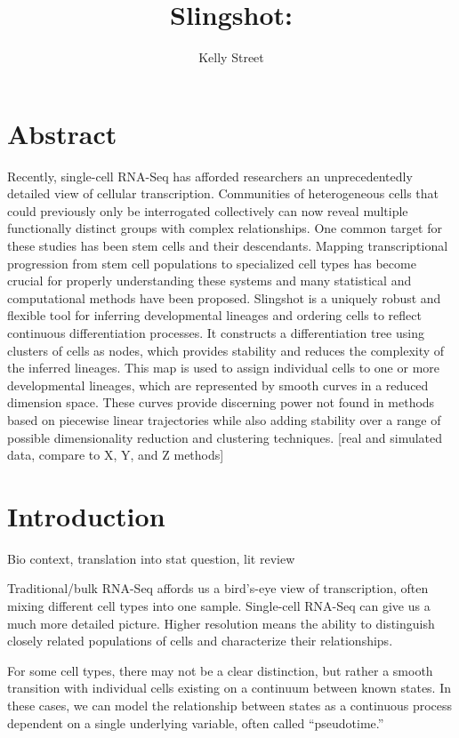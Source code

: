 \documentclass[11pt]{article}\usepackage[]{graphicx}\usepackage[]{color}
\title{Slingshot: }
\author{Kelly Street}
\date{}
\begin{document}
\maketitle

\section{Abstract}
Recently, single-cell RNA-Seq has afforded researchers an unprecedentedly detailed view of cellular transcription. Communities of heterogeneous cells that could previously only be interrogated collectively can now reveal multiple functionally distinct groups with complex relationships. One common target for these studies has been stem cells and their descendants. Mapping transcriptional progression from stem cell populations to specialized cell types has become crucial for properly understanding these systems and many statistical and computational methods have been proposed. Slingshot is a uniquely robust and flexible tool for inferring developmental lineages and ordering cells to reflect continuous differentiation processes. It constructs a differentiation tree using clusters of cells as nodes, which provides stability and reduces the complexity of the inferred lineages. This map is used to assign individual cells to one or more developmental lineages, which are represented by smooth curves in a reduced dimension space. These curves provide discerning power not found in methods based on piecewise linear trajectories while also adding stability over a range of possible dimensionality reduction and clustering techniques. [real and simulated data, compare to X, Y, and Z methods]

\section{Introduction}
Bio context, translation into stat question, lit review

Traditional/bulk RNA-Seq affords us a bird's-eye view of transcription, often mixing different cell types into one sample. Single-cell RNA-Seq can give us a much more detailed picture. Higher resolution means the ability to distinguish closely related populations of cells and characterize their relationships.

For some cell types, there may not be a clear distinction, but rather a smooth transition with individual cells existing on a continuum between known states. In these cases, we can model the relationship between states as a continuous process dependent on a single underlying variable, often called ``pseudotime.''
\end{document}

